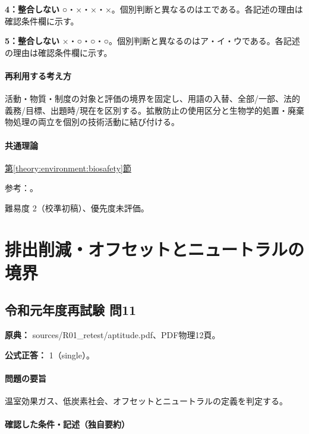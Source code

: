 \noindent\textbf{4：整合しない} ○・×・×・×。個別判断と異なるのはエである。各記述の理由は確認条件欄に示す。\par

\noindent\textbf{5：整合しない} ×・○・○・○。個別判断と異なるのはア・イ・ウである。各記述の理由は確認条件欄に示す。\par

\paragraph{再利用する考え方} 活動・物質・制度の対象と評価の境界を固定し、用語の入替、全部/一部、法的義務/目標、出題時/現在を区別する。拡散防止の使用区分と生物学的処置・廃棄物処理の両立を個別の技術活動に結び付ける。

\paragraph{共通理論} \hyperref[theory:environment:biosafety]{第\ref*{theory:environment:biosafety}節}

\par 参考：\cite{env_biosafety_qa,env_biosafety_school,env_biosafety_law}。

\par 難易度 2（校準初稿）、優先度未評価。

\section{排出削減・オフセットとニュートラルの境界}

\subsection{令和元年度再試験 問11}
\label{q:r01-ret-apt-11}

\noindent\textbf{原典：} sources/R01\_retest/aptitude.pdf、PDF物理12頁。

\textbf{公式正答：} 1（single）。

\paragraph{問題の要旨} 温室効果ガス、低炭素社会、オフセットとニュートラルの定義を判定する。

\paragraph{確認した条件・記述（独自要約）}\mbox{}\par

